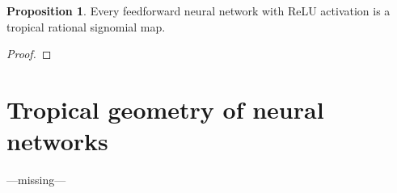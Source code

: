 \documentclass{article}
\theoremstyle{definition}
\newtheorem{proposition}[theorem]{Proposition}
\begin{document}
\begin{proposition}\cite{zhang2018tropical}
Every feedforward neural network with ReLU activation is a tropical rational signomial map.
\end{proposition}
\begin{proof}

\end{proof}
\newpage

\section{Tropical geometry of neural networks}
\label{sec:tropical_geometry_of_neural_networks}

---missing---

\newpage

%
%
%
%
%
%
%
%
%
%
%




\end{document}
